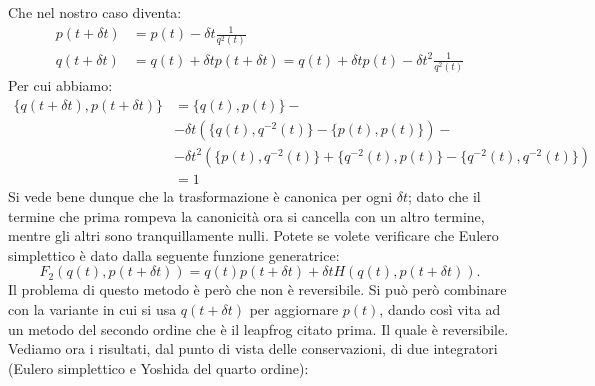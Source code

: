 \documentclass[10pt,a4paper]{article}
\begin{document}
Che nel nostro caso diventa:
\begin{align}
p(t+ \delta t) &=p(t) - \delta t \frac{1}{q^2(t)}\\
q(t+ \delta t) &=q(t) + \delta t p(t+ \delta t) = q(t) + \delta t p(t) - \delta t^2 \frac{1}{q^2(t)}
\end{align}
Per cui abbiamo:
\begin{equation}
\begin{split}
\{q(t+ \delta t), p(t+ \delta t)\} &= \{q(t), p(t)\} - \\
&- \delta t( \{q(t), q^{-2}(t)\} - \{p(t), p(t)\}) - \\
&- \delta t^2( \{p(t), q^{-2}(t) \} + \{q^{-2}(t), p(t) \} - \{ q^{-2}(t), q^{-2}(t)\}) \\
&=1
\end{split} 
\end{equation}
Si vede bene dunque che la trasformazione è canonica per ogni $\delta t$; dato che il termine che prima rompeva la canonicità ora si cancella con un altro termine, mentre gli altri sono tranquillamente nulli. Potete se volete verificare che Eulero simplettico è dato dalla seguente funzione generatrice:
\begin{equation}
F_2(q(t), p(t + \delta t) ) = q(t) p(t + \delta t) + \delta t H(q(t), p(t + \delta t)).
\end{equation}
Il problema di questo metodo è però che non è reversibile. Si può però combinare con la variante in cui si usa $q(t+\delta t)$ per aggiornare $p(t)$, dando così vita ad un metodo del secondo ordine che è il leapfrog citato prima. Il quale è reversibile.
Vediamo ora i risultati, dal punto di vista delle conservazioni, di due integratori (Eulero simplettico e Yoshida del quarto ordine):
\FloatBarrier
\end{document}

